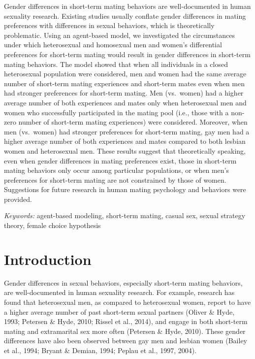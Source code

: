 \documentclass[
  11pt,
]{article}
\begin{document}
Gender differences in short-term mating behaviors are well-documented in
human sexuality research. Existing studies usually conflate gender
differences in mating preferences with differences in sexual behaviors,
which is theoretically problematic. Using an agent-based model, we
investigated the circumstances under which heterosexual and homosexual
men and women's differential preferences for short-term mating would
result in gender differences in short-term mating behaviors. The model
showed that when all individuals in a closed heterosexual population
were considered, men and women had the same average number of short-term
mating experiences and short-term mates even when men had stronger
preferences for short-term mating. Men (vs.~women) had a higher average
number of both experiences and mates only when heterosexual men and
women who successfully participated in the mating pool (i.e., those with
a non-zero number of short-term mating experiences) were considered.
Moreover, when men (vs.~women) had stronger preferences for short-term
mating, gay men had a higher average number of both experiences and
mates compared to both lesbian women and heterosexual men. These results
suggest that theoretically speaking, even when gender differences in
mating preferences exist, those in short-term mating behaviors only
occur among particular populations, or when men's preferences for
short-term mating are not constrained by those of women. Suggestions for
future research in human mating psychology and behaviors were provided.

\hfill\break

\emph{Keywords:} agent-based modeling, short-term mating, casual sex,
sexual strategy theory, female choice hypothesis

\newpage

\hypertarget{introduction}{%
\section{Introduction}\label{introduction}}

Gender differences in sexual behaviors, especially short-term mating
behaviors, are well-documented in human sexuality research. For example,
research has found that heterosexual men, as compared to heterosexual
women, report to have a higher average number of past short-term sexual
partners (Oliver \& Hyde, 1993; Petersen \& Hyde, 2010; Rissel et al.,
2014), and engage in both short-term mating and extramarital sex more
often (Petersen \& Hyde, 2010). These gender differences have also been
observed between gay men and lesbian women (Bailey et al., 1994; Bryant
\& Demian, 1994; Peplau et al., 1997, 2004).
\end{document}
